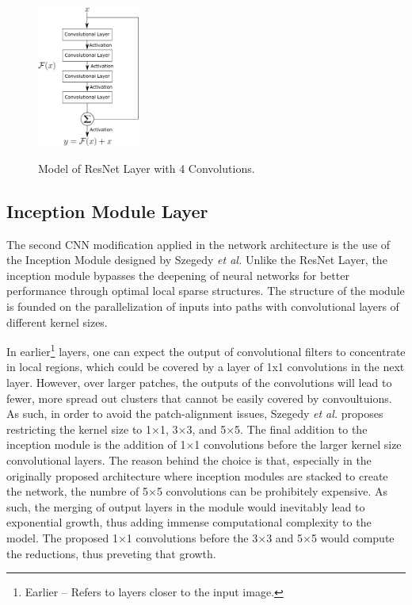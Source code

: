 \documentclass[conference]{IEEEtran}
\begin{document}
\begin{figure}
\centering
\includegraphics[width=0.3\textwidth]{figures/ResNet_Model.png}
\label{ResNet_Layer_Model}
\caption{Model of ResNet Layer with 4 Convolutions.}
\end{figure}

\subsection{Inception Module Layer}
The second CNN modification applied in the network architecture is the use of the Inception Module \cite{Szegedy2014} designed by Szegedy \emph{et al.} Unlike the ResNet Layer, the inception module bypasses the deepening of neural networks for better performance through optimal local sparse structures. The structure of the module is founded on the parallelization of inputs into paths with convolutional layers of different kernel sizes.

In earlier\footnote{Earlier -- Refers to layers closer to the input image.} layers, one can expect the output of convolutional filters to concentrate in local regions, which could be covered by a layer of 1x1 convolutions in the next layer. However, over larger patches, the outputs of the convolutions will lead to fewer, more spread out clusters that cannot be easily covered by convoultuions. As such, in order to avoid the patch-alignment issues, Szegedy \emph{et al.} proposes restricting the kernel size to 1$\times$1, 3$\times$3, and 5$\times$5. The final addition to the inception module is the addition of 1$\times$1 convolutions before the larger kernel size convolutional layers. The reason behind the choice is that, especially in the originally proposed architecture where inception modules are stacked to create the network, the numbre of 5$\times$5 convolutions can be prohibitely expensive. As such, the merging of output layers in the module would inevitably lead to exponential growth, thus adding immense computational complexity to the model. The proposed 1$\times$1 convolutions before the 3$\times$3 and 5$\times$5 would compute the reductions, thus preveting that growth. 
\end{document}
